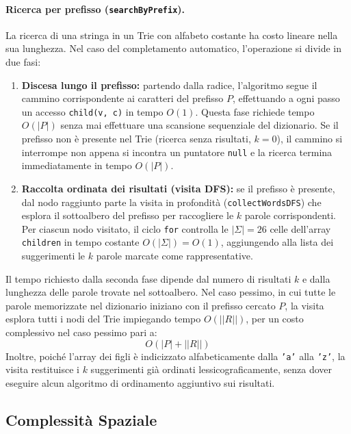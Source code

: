 \documentclass[11pt,a4paper]{article}
\begin{document}
\paragraph{Ricerca per prefisso (\texttt{searchByPrefix}).}
La ricerca di una stringa in un Trie con alfabeto costante ha costo lineare nella sua lunghezza. Nel caso del completamento automatico, l'operazione si divide in due fasi:
\begin{enumerate}
    \item \textbf{Discesa lungo il prefisso:} partendo dalla radice, l'algoritmo segue il cammino corrispondente ai caratteri del prefisso $P$, effettuando a ogni passo un accesso \texttt{child(v, c)} in tempo $O(1)$. Questa fase richiede tempo $O(|P|)$ senza mai effettuare una scansione sequenziale del dizionario. Se il prefisso non è presente nel Trie (ricerca senza risultati, $k = 0$), il cammino si interrompe non appena si incontra un puntatore \texttt{null} e la ricerca termina immediatamente in tempo $O(|P|)$.
    \item \textbf{Raccolta ordinata dei risultati (visita DFS):} se il prefisso è presente, dal nodo raggiunto parte la visita in profondità (\texttt{collectWordsDFS}) che esplora il sottoalbero del prefisso per raccogliere le $k$ parole corrispondenti. Per ciascun nodo visitato, il ciclo \texttt{for} controlla le $|\Sigma| = 26$ celle dell'array \texttt{children} in tempo costante $O(|\Sigma|) = O(1)$, aggiungendo alla lista dei suggerimenti le $k$ parole marcate come rappresentative.
\end{enumerate}
Il tempo richiesto dalla seconda fase dipende dal numero di risultati $k$ e dalla lunghezza delle parole trovate nel sottoalbero. Nel caso pessimo, in cui tutte le parole memorizzate nel dizionario iniziano con il prefisso cercato $P$, la visita esplora tutti i nodi del Trie impiegando tempo $O(||R||)$, per un costo complessivo nel caso pessimo pari a:
\[
    O(|P| + ||R||)
\]
Inoltre, poiché l'array dei figli è indicizzato alfabeticamente dalla \texttt{'a'} alla \texttt{'z'}, la visita restituisce i $k$ suggerimenti già ordinati lessicograficamente, senza dover eseguire alcun algoritmo di ordinamento aggiuntivo sui risultati.

\subsection{Complessità Spaziale}
\end{document}
